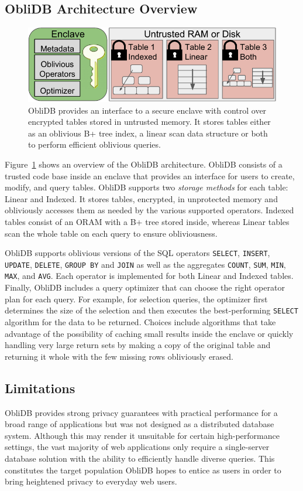 \documentclass[letterpaper,twocolumn,10pt]{article}
\def\name/{ObliDB}
\begin{document}
\subsection{\name/ Architecture Overview}
\begin{figure}
\centering
\includegraphics[width=\linewidth]{figure_revised.pdf}
\caption{\small \name/ provides an interface to a secure enclave with control over encrypted tables stored in untrusted memory. It stores tables either as an oblivious B+ tree index, a linear scan data structure or both to perform efficient oblivious queries.}
\label{arch}
\end{figure}
Figure~\ref{arch} shows an overview of the \name/ architecture. \name/ consists of a trusted code base inside an enclave that provides an interface for users to create, modify, and query tables. \name/ supports two \emph{storage methods} for each table: Linear and Indexed. It stores tables, encrypted, in unprotected memory and obliviously accesses them as needed by the various supported operators. Indexed tables consist of an ORAM with a B+ tree stored inside, whereas Linear tables scan the whole table on each query to ensure obliviousness.

  \name/ supports oblivious versions of the SQL operators \texttt{SELECT}, \texttt{INSERT}, \texttt{UPDATE}, \texttt{DELETE}, \texttt{GROUP BY} and \texttt{JOIN} as well as the aggregates \texttt{COUNT}, \texttt{SUM}, \texttt{MIN}, \texttt{MAX}, and \texttt{AVG}. Each operator is implemented for both Linear and Indexed tables. Finally, ObliDB includes a query optimizer that can choose the right operator plan for each query. For example, for selection queries, the optimizer first determines the size of the selection and then executes the best-performing \texttt{SELECT} algorithm for the data to be returned. Choices include algorithms that take advantage of the possibility of caching small results inside the enclave or quickly handling very large return sets by making a copy of the original table and returning it whole with the few missing rows obliviously erased.

\subsection{Limitations}
\name/ provides strong privacy guarantees with practical performance for a broad range of applications but was not designed as a distributed database system. Although this may render it unsuitable for certain high-performance settings, the vast majority of web applications only require a single-server database solution with the ability to efficiently handle diverse queries. This constitutes the target population \name/ hopes to entice as users in order to bring heightened privacy to everyday web users.
\end{document}
